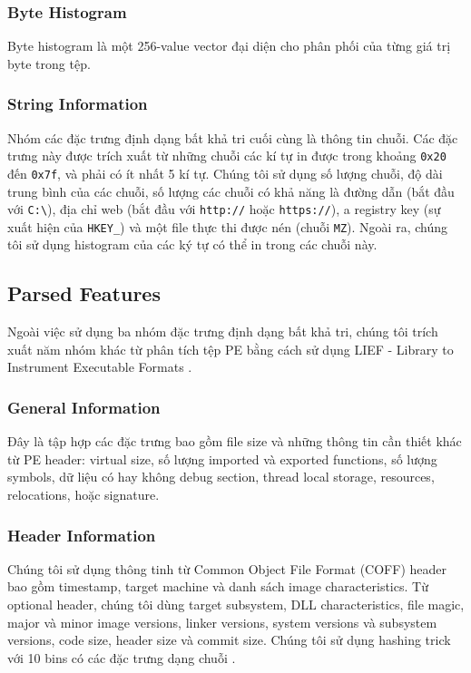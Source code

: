 \subsubsection{Byte Histogram}

Byte histogram là một 256-value vector đại diện cho phân phối của từng giá trị byte trong tệp.

\subsubsection{String Information}

Nhóm các đặc trưng định dạng bất khả tri cuối cùng là thông tin chuỗi. Các đặc trưng này được trích xuất từ những chuỗi các kí tự in được trong khoảng \verb|0x20| đến \verb|0x7f|, và phải có ít nhất 5 kí tự. Chúng tôi sử dụng số lượng chuỗi, độ dài trung bình của các chuỗi, số lượng các chuỗi có khả năng là đường dẫn (bắt đầu với \verb|C:\|), địa chỉ web (bắt đầu với \verb|http://| hoặc \verb|https://|), a registry key (sự xuất hiện của \verb|HKEY_|) và một file thực thi được nén (chuỗi \verb|MZ|). Ngoài ra, chúng tôi sử dụng histogram của các ký tự có thể in trong các chuỗi này.

\subsection{Parsed Features}

Ngoài việc sử dụng ba nhóm đặc trưng định dạng bất khả tri, chúng tôi trích xuất năm nhóm khác từ phân tích tệp PE bằng cách sử dụng LIEF - Library to Instrument Executable Formats \cite{lief}.

\subsubsection{General Information}

Đây là tập hợp các đặc trưng bao gồm file size và những thông tin cần thiết khác từ PE header:  virtual size, số lượng imported và exported functions, số lượng symbols, dữ liệu có hay không debug section, thread local storage, resources, relocations, hoặc signature.

\subsubsection{Header Information}

Chúng tôi sử dụng thông tinh từ Common Object File Format (COFF) header bao gồm timestamp, target machine và danh sách image characteristics. Từ optional header, chúng tôi dùng target subsystem, DLL characteristics, file magic, major và minor image versions, linker versions, system versions và subsystem versions, code size, header size và commit size. Chúng tôi sử dụng hashing trick với 10 bins có các đặc trưng dạng chuỗi \cite{weinberger2009feature}.

